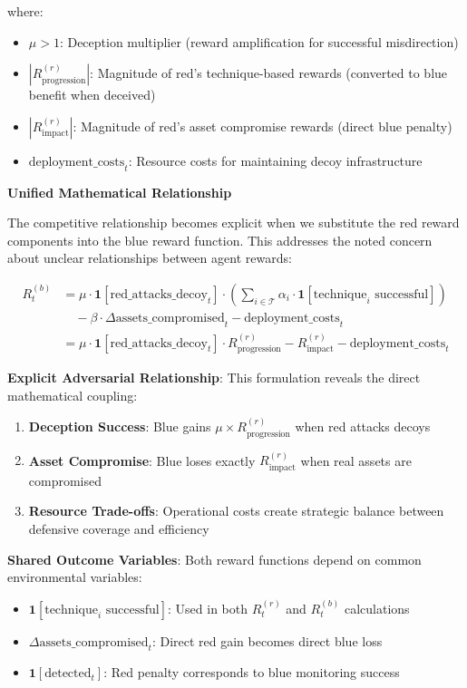 \documentclass[12pt]{article}
\theoremstyle{definition}
\theoremstyle{plain}
\begin{document}
where:
\begin{itemize}
    \item $\mu > 1$: Deception multiplier (reward amplification for successful misdirection)
    \item $|R^{(r)}_{\text{progression}}|$: Magnitude of red's technique-based rewards (converted to blue benefit when deceived)
    \item $|R^{(r)}_{\text{impact}}|$: Magnitude of red's asset compromise rewards (direct blue penalty)
    \item $\text{deployment\_costs}_t$: Resource costs for maintaining decoy infrastructure
\end{itemize}

\textbf{Unified Mathematical Relationship}

The competitive relationship becomes explicit when we substitute the red reward components into the blue reward function. This addresses the noted concern about unclear relationships between agent rewards:

\begin{align}
R^{(b)}_t &= \mu \cdot \mathbf{1}[\text{red\_attacks\_decoy}_t] \cdot \left(\sum_{i \in \mathcal{T}} \alpha_i \cdot \mathbf{1}[\text{technique}_i \text{ successful}]\right) \\
&\quad - \beta \cdot \Delta\text{assets\_compromised}_t - \text{deployment\_costs}_t \\
&= \mu \cdot \mathbf{1}[\text{red\_attacks\_decoy}_t] \cdot R^{(r)}_{\text{progression}} - R^{(r)}_{\text{impact}} - \text{deployment\_costs}_t
\end{align}

\textbf{Explicit Adversarial Relationship}: This formulation reveals the direct mathematical coupling:
\begin{enumerate}
    \item \textbf{Deception Success}: Blue gains $\mu \times R^{(r)}_{\text{progression}}$ when red attacks decoys
    \item \textbf{Asset Compromise}: Blue loses exactly $R^{(r)}_{\text{impact}}$ when real assets are compromised  
    \item \textbf{Resource Trade-offs}: Operational costs create strategic balance between defensive coverage and efficiency
\end{enumerate}

\textbf{Shared Outcome Variables}: Both reward functions depend on common environmental variables:
\begin{itemize}
    \item $\mathbf{1}[\text{technique}_i \text{ successful}]$: Used in both $R^{(r)}_t$ and $R^{(b)}_t$ calculations
    \item $\Delta\text{assets\_compromised}_t$: Direct red gain becomes direct blue loss
    \item $\mathbf{1}[\text{detected}_t]$: Red penalty corresponds to blue monitoring success
\end{itemize}
\end{document}
